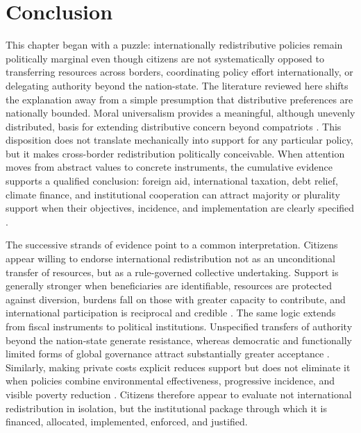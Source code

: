 \section*{Conclusion}
This chapter began with a puzzle: %
internationally redistributive policies remain politically marginal even though citizens are not systematically opposed to transferring resources across borders, coordinating policy effort internationally, or delegating authority beyond the nation-state. The literature reviewed here shifts the explanation away from a simple presumption that distributive preferences are nationally bounded. Moral universalism provides a meaningful, although unevenly distributed, basis for extending distributive concern beyond compatriots \citep{enke_moral_2023}. This disposition does not translate mechanically into support for any particular policy, but it makes cross-border redistribution politically conceivable. When attention moves from abstract values to concrete instruments, the cumulative evidence supports a qualified conclusion: foreign aid, international taxation, debt relief, climate finance, and institutional cooperation can attract majority or plurality support when their objectives, incidence, and implementation are clearly specified \citep{fabre_majority_2025,fabre_public_2026}.

The successive strands of evidence point to a common interpretation. Citizens appear willing to endorse international redistribution not as an unconditional transfer of resources, but as a rule-governed collective undertaking. Support is generally stronger when beneficiaries are identifiable, resources are protected against diversion, burdens fall on those with greater capacity to contribute, and international participation is reciprocal and credible \citep{fabre_majority_2025,fabre_public_2026,gampfer_obtaining_2014}. The same logic extends from fiscal instruments to political institutions. Unspecified transfers of authority beyond the nation-state generate resistance, whereas democratic and functionally limited forms of global governance attract substantially greater acceptance \citep{ghassim_who_2024}. Similarly, making private costs explicit reduces support but does not eliminate it when policies combine environmental effectiveness, progressive incidence, and visible poverty reduction \citep{bechtel_mass_2013,fabre_public_2026}. Citizens therefore appear to evaluate not international redistribution in isolation, but the institutional package through which it is financed, allocated, implemented, enforced, and justified.

